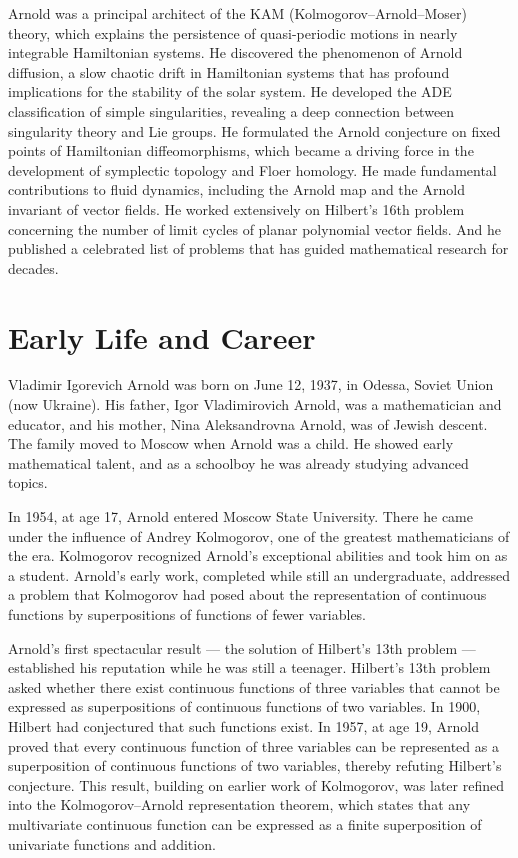 Arnold was a principal architect of the KAM (Kolmogorov--Arnold--Moser) theory, which explains the persistence of quasi-periodic motions in nearly integrable Hamiltonian systems. He discovered the phenomenon of Arnold diffusion, a slow chaotic drift in Hamiltonian systems that has profound implications for the stability of the solar system. He developed the ADE classification of simple singularities, revealing a deep connection between singularity theory and Lie groups. He formulated the Arnold conjecture on fixed points of Hamiltonian diffeomorphisms, which became a driving force in the development of symplectic topology and Floer homology. He made fundamental contributions to fluid dynamics, including the Arnold map and the Arnold invariant of vector fields. He worked extensively on Hilbert's 16th problem concerning the number of limit cycles of planar polynomial vector fields. And he published a celebrated list of problems that has guided mathematical research for decades.

\section{Early Life and Career}

Vladimir Igorevich Arnold was born on June 12, 1937, in Odessa, Soviet Union (now Ukraine). His father, Igor Vladimirovich Arnold, was a mathematician and educator, and his mother, Nina Aleksandrovna Arnold, was of Jewish descent. The family moved to Moscow when Arnold was a child. He showed early mathematical talent, and as a schoolboy he was already studying advanced topics.

In 1954, at age 17, Arnold entered Moscow State University. There he came under the influence of Andrey Kolmogorov, one of the greatest mathematicians of the era. Kolmogorov recognized Arnold's exceptional abilities and took him on as a student. Arnold's early work, completed while still an undergraduate, addressed a problem that Kolmogorov had posed about the representation of continuous functions by superpositions of functions of fewer variables.

Arnold's first spectacular result --- the solution of Hilbert's 13th problem --- established his reputation while he was still a teenager. Hilbert's 13th problem asked whether there exist continuous functions of three variables that cannot be expressed as superpositions of continuous functions of two variables. In 1900, Hilbert had conjectured that such functions exist. In 1957, at age 19, Arnold proved that every continuous function of three variables can be represented as a superposition of continuous functions of two variables, thereby refuting Hilbert's conjecture. This result, building on earlier work of Kolmogorov, was later refined into the Kolmogorov--Arnold representation theorem, which states that any multivariate continuous function can be expressed as a finite superposition of univariate functions and addition.

